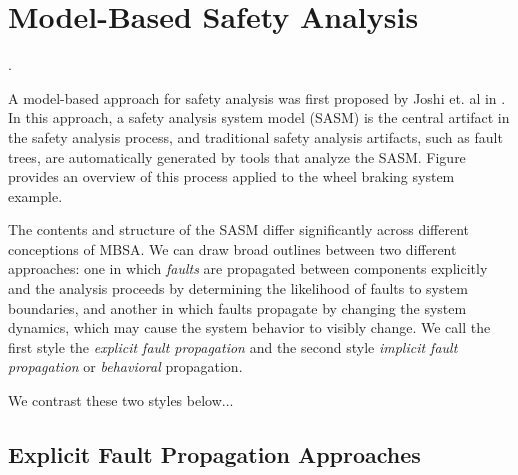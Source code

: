 \section{Model-Based Safety Analysis}

.

A model-based approach for safety analysis was first proposed by Joshi et. al in \cite{Joshi05:Dasc, Joshi05:SafeComp, Joshi07:Hase}.  In this approach, a safety analysis system model (SASM) is the central artifact in the safety analysis process, and traditional safety analysis artifacts, such as fault trees, are automatically generated by tools that analyze the SASM. Figure~ provides an overview of this process applied to the wheel braking system example.

The contents and structure of the SASM differ significantly across different conceptions of MBSA.  We can draw broad outlines between two different approaches: one in which {\em faults} are propagated between components explicitly and the analysis proceeds by determining the likelihood of faults to system boundaries, and another in which faults propagate by changing the system dynamics, which may cause the system behavior to visibly change.  We call the first style the {\em explicit fault propagation} and the second style {\em implicit fault propagation} or {\em behavioral} propagation.

We contrast these two styles below...





\subsection{Explicit Fault Propagation Approaches}




